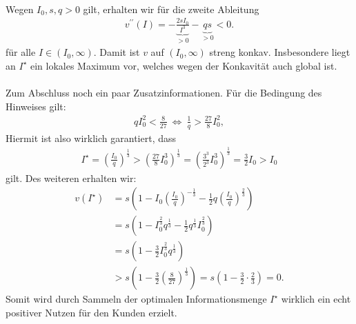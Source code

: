 \\
Wegen  $I_0, s , q > 0$ gilt, erhalten wir für die zweite Ableitung
\begin{align*}
	v^{\prime \prime}(I)
	= -\underbrace{ \frac{2s I_0}{I^3}}_{>0} - \underbrace{qs}_{>0} < 0.
\end{align*}
für alle $I \in (I_0, \infty)$. Damit ist $v$ auf $(I_0, \infty)$ streng konkav.
Insbesondere liegt an $I^\star $ ein lokales Maximum vor, welches wegen der Konkavität auch global ist.\\
\\
Zum Abschluss noch ein paar Zusatzinformationen. Für die Bedingung des Hinweises gilt:
\begin{align*}
	q I_0^2 < \frac{8}{27}
	\ \Leftrightarrow \
	\frac{1}{q} > \frac{27 }{8} I_0^2,
\end{align*}
Hiermit ist also wirklich garantiert, dass
\begin{align*}
	I^\star 
	= 
	\left(\frac{I_0}{q}\right)^\frac{1}{3}
	>
	\left(\frac{27}{8} I_0^3\right)^\frac{1}{3}
	=
	\left(\frac{3^3}{2^3} I_0^3\right)^\frac{1}{3}
	= \frac{3}{2} I_0 > I_0
\end{align*}
gilt. Des weiteren erhalten wir:
\begin{align*}
	v(I^\star )
	&=
	s 
	\left(
		1 
		- 
		I_0 \left(\frac{I_0}{q}\right)^{-\frac{1}{3}}
		-
		\frac{1}{2} q \left(\frac{I_0}{q}\right)^{\frac{2}{3}}
	\right)\\
	&=
	s 
	\left(
	1 
	- 
	I_0^{\frac{2}{3}} q^{\frac{1}{3}}
	-
	\frac{1}{2} q^{\frac{1}{3}} I_0^\frac{2}{3}
	\right)\\
	&=
	s 
	\left(
	1 
	- 
	\frac{3}{2}
	I_0^{\frac{2}{3}} q^{\frac{1}{3}}
	\right)\\
	&> 
	s 
	\left(
	1 
	- 
	\frac{3}{2} \left(\frac{8}{27}\right)^\frac{1}{3}
	\right)
	=
	s 
	\left(
	1 
	- 
	\frac{3}{2} \cdot \frac{2}{3}
	\right)
	= 0.
\end{align*}
Somit wird durch Sammeln der optimalen Informationsmenge $I^\star$ wirklich ein echt positiver Nutzen für den Kunden erzielt.

